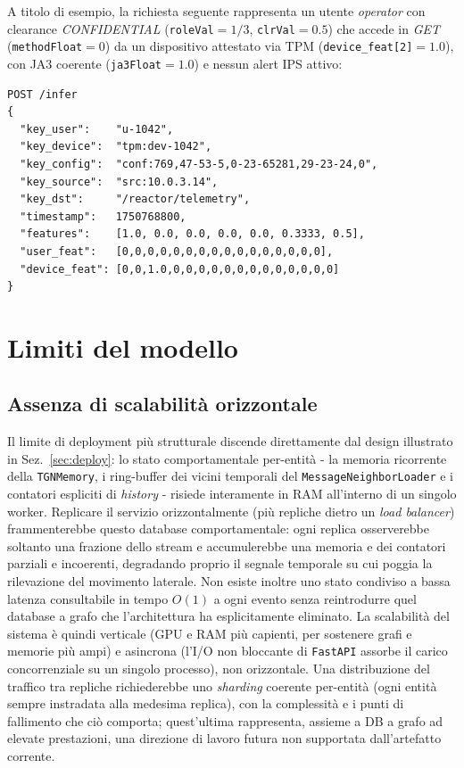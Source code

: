 A titolo di esempio, la richiesta seguente rappresenta un utente \textit{operator} con clearance \textit{CONFIDENTIAL} (\texttt{roleVal}$=1/3$, \texttt{clrVal}$=0.5$) che accede in \textit{GET} (\texttt{methodFloat}$=0$) da un dispositivo attestato via TPM (\texttt{device\_feat[2]}$=1.0$), con JA3 coerente (\texttt{ja3Float}$=1.0$) e nessun alert IPS attivo:

\begin{verbatim}
POST /infer
{
  "key_user":    "u-1042",
  "key_device":  "tpm:dev-1042",
  "key_config":  "conf:769,47-53-5,0-23-65281,29-23-24,0",
  "key_source":  "src:10.0.3.14",
  "key_dst":     "/reactor/telemetry",
  "timestamp":   1750768800,
  "features":    [1.0, 0.0, 0.0, 0.0, 0.0, 0.3333, 0.5],
  "user_feat":   [0,0,0,0,0,0,0,0,0,0,0,0,0,0,0,0],
  "device_feat": [0,0,1.0,0,0,0,0,0,0,0,0,0,0,0,0,0]
}
\end{verbatim}

\section{Limiti del modello}
\label{sec:limiti}

\subsection{Assenza di scalabilità orizzontale}

Il limite di deployment più strutturale discende direttamente dal design illustrato in Sez.~\ref{sec:deploy}: lo stato comportamentale per-entità - la memoria ricorrente della \texttt{TGNMemory}, i ring-buffer dei vicini temporali del \texttt{MessageNeighborLoader} e i contatori espliciti di \textit{history} - risiede interamente in RAM all'interno di un singolo worker. Replicare il servizio orizzontalmente (più repliche dietro un \textit{load balancer}) frammenterebbe questo database comportamentale: ogni replica osserverebbe soltanto una frazione dello stream e accumulerebbe una memoria e dei contatori parziali e incoerenti, degradando proprio il segnale temporale su cui poggia la rilevazione del movimento laterale. Non esiste inoltre uno stato condiviso a bassa latenza consultabile in tempo $O(1)$ a ogni evento senza reintrodurre quel database a grafo che l'architettura ha esplicitamente eliminato. La scalabilità del sistema è quindi verticale (GPU e RAM più capienti, per sostenere grafi e memorie più ampi) e asincrona (l'I/O non bloccante di \texttt{FastAPI} assorbe il carico concorrenziale su un singolo processo), non orizzontale. Una distribuzione del traffico tra repliche richiederebbe uno \textit{sharding} coerente per-entità (ogni entità sempre instradata alla medesima replica), con la complessità e i punti di fallimento che ciò comporta; quest'ultima rappresenta, assieme a DB a grafo ad elevate prestazioni, una direzione di lavoro futura non supportata dall'artefatto corrente.

